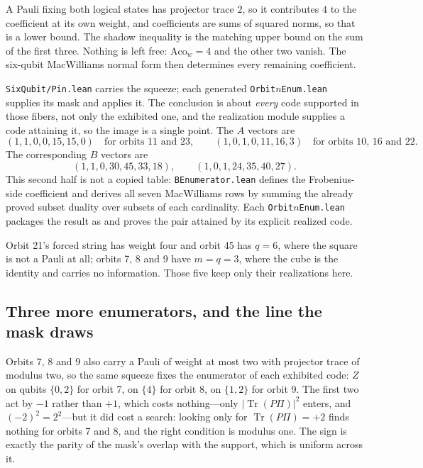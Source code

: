 \documentclass[11pt,a4paper]{article}
\newcommand{\lean}[1]{\texttt{#1}}
\theoremstyle{definition}
\begin{document}
A Pauli fixing both logical states has projector trace $2$, so it contributes
$4$ to the coefficient at its own weight, and coefficients are sums of squared
norms, so that is a lower bound. The shadow inequality is the matching upper
bound on the sum of the first three. Nothing is left free:
$\mathrm{Aco}_w=4$ and the other two vanish. The six-qubit MacWilliams normal
form then determines every remaining coefficient.

\lean{SixQubit/Pin.lean} carries the squeeze; each generated
\lean{Orbit$n$Enum.lean} supplies its mask and applies it. The conclusion is
about \emph{every} code supported in those fibers, not only the exhibited one,
and the realization module supplies a code attaining it, so the image is a
single point.  The $A$ vectors are
\[
  (1,1,0,0,15,15,0) \quad\text{for orbits 11 and 23},
  \qquad
  (1,0,1,0,11,16,3) \quad\text{for orbits 10, 16 and 22}.
\]
The corresponding $B$ vectors are
\[
  (1,1,0,30,45,33,18),
  \qquad
  (1,0,1,24,35,40,27).
\]
This second half is not a copied table: \lean{BEnumerator.lean} defines the
Frobenius-side coefficient and derives all seven MacWilliams rows by summing
the already proved subset duality over subsets of each cardinality.  Each
\lean{Orbit$n$Enum.lean} packages the result as
 and proves the pair attained by its
explicit realized code.

Orbit 21's forced string has weight four and orbit 45 has $q=6$, where the
square is not a Pauli at all; orbits 7, 8 and 9 have $m=q=3$, where the cube is
the identity and carries no information. Those five keep only their
realizations here.

\subsection{Three more enumerators, and the line the mask draws}

Orbits 7, 8 and 9 also carry a Pauli of weight at most two with projector trace
of modulus two, so the same squeeze fixes the enumerator of each exhibited code:
$Z$ on qubits $\{0,2\}$ for orbit 7, on $\{4\}$ for orbit 8, on $\{1,2\}$ for
orbit 9. The first two act by $-1$ rather than $+1$, which costs nothing---only
$|\operatorname{Tr}(P\Pi)|^2$ enters, and $(-2)^2=2^2$---but it did cost a
search: looking only for $\operatorname{Tr}(P\Pi)=+2$ finds nothing for orbits 7
and 8, and the right condition is modulus one. The sign is exactly the parity of
the mask's overlap with the support, which is uniform across it.
\end{document}
